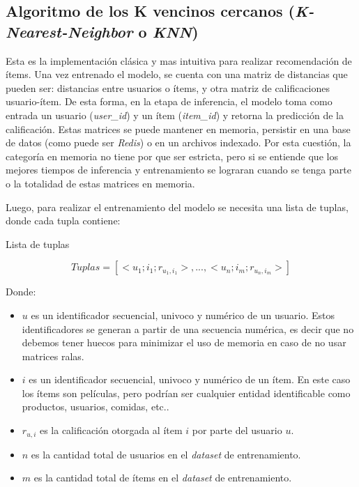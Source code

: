 \documentclass[11pt,a4paper,twoside]{thesis}
\begin{document}
\subsection{Algoritmo de los K vencinos cercanos (\textit{K-Nearest-Neighbor} o \textit{KNN})}

Esta es la implementación clásica y mas intuitiva para realizar recomendación
de ítems. Una vez entrenado el modelo, se cuenta con una matriz de distancias
que pueden ser: distancias entre usuarios o ítems, y otra matriz de
calificaciones usuario-ítem. De esta forma, en la etapa de inferencia, el
modelo toma como entrada un usuario (\textit{user\_id}) y un ítem
(\textit{item\_id}) y retorna la predicción de la calificación. Estas matrices
se puede mantener en memoria, persistir en una base de datos (como puede ser
\textit{Redis}) o en un archivos indexado. Por esta cuestión, la categoría en
memoria no tiene por que ser estricta, pero si se entiende que los mejores
tiempos de inferencia y entrenamiento se lograran cuando se tenga parte o la
totalidad de estas matrices en memoria.

\clearpage

Luego, para realizar el entrenamiento del modelo se necesita una lista de
tuplas, donde cada tupla contiene:

\begin{description}
	\item[Lista de tuplas]
\end{description}
\begin{equation}
	Tuplas = [<u_1; i_1; r_{u_1, i_1}>,...,<u_n; i_m; r_{u_n, i_m}>]
\end{equation}
\begin{description}
	\item[Donde:]
\end{description}
\begin{itemize}
	\item $u$ es un identificador secuencial, univoco y numérico de un usuario. Estos identificadores se generan a partir de una secuencia numérica, es decir que no debemos tener huecos para minimizar el uso de memoria en caso de no usar matrices ralas.
	\item $i$ es un identificador secuencial, univoco y numérico de un ítem. En este caso los ítems son películas, pero podrían ser cualquier entidad identificable como productos, usuarios, comidas, etc..
	\item $r_{u, i}$ es la calificación otorgada al ítem $i$ por parte del usuario $u$.
	\item $n$ es la cantidad total de usuarios en el \textit{dataset} de entrenamiento.
	\item $m$ es la cantidad total de ítems en el \textit{dataset} de entrenamiento.
\end{itemize}
\end{document}
